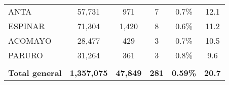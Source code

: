 \begin{tabular}{lccccc}
	\cellcolor[HTML]{FFFF99}ANTA                                    & 57,731               & 971                                  & 7                    & 0.7\%                      & 12.1                                        \\
	\cellcolor[HTML]{FFFF99}ESPINAR                                 & 71,304               & 1,420                                & 8                    & 0.6\%                      & 11.2                                        \\
	\cellcolor[HTML]{FFFF99}ACOMAYO                                 & 28,477               & 429                                  & 3                    & 0.7\%                      & 10.5                                        \\
	\cellcolor[HTML]{FFFF99}PARURO                                  & 31,264               & 361                                  & 3                    & 0.8\%                      & 9.6                                         \\
	& \multicolumn{1}{l}{} & \multicolumn{1}{l}{}                 & \multicolumn{1}{l}{} & \multicolumn{1}{l}{}       & \multicolumn{1}{l}{}                        \\
	\rowcolor[HTML]{DDEBF7} 
	\textbf{Total general}                                          & \textbf{1,357,075}   & \textbf{47,849}                      & \textbf{281}         & \textbf{0.59\%}            & \textbf{20.7}                              
\end{tabular}